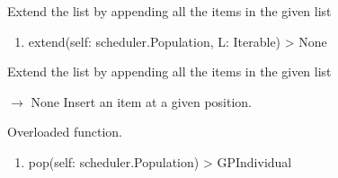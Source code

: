 \documentclass[letterpaper,10pt,english]{sphinxmanual}
\begin{document}
\begin{fulllineitems}
\begin{fulllineitems}
\begin{enumerate}
\end{enumerate}

\sphinxAtStartPar
Extend the list by appending all the items in the given list
\begin{enumerate}
%
\setcounter{enumi}{1}
\item {} 
\sphinxAtStartPar
extend(self: scheduler.Population, L: Iterable) \sphinxhyphen{}\textgreater{} None

\end{enumerate}

\sphinxAtStartPar
Extend the list by appending all the items in the given list

\end{fulllineitems}


\begin{fulllineitems}
\label{\detokenize{api:scheduler.Population.insert}}
\pysigstartsignatures
\pysiglinewithargsret
{}
{\sphinxparamcomma {}\sphinxparamcomma {}}
{{ $\rightarrow$ None}}
\pysigstopsignatures
\sphinxAtStartPar
Insert an item at a given position.

\end{fulllineitems}


\begin{fulllineitems}
\label{\detokenize{api:scheduler.Population.pop}}
\pysigstartsignatures
\pysiglinewithargsret
{}
{\sphinxparamcomma {}}
{}
\pysigstopsignatures
\sphinxAtStartPar
Overloaded function.
\begin{enumerate}
%
\item {} 
\sphinxAtStartPar
pop(self: scheduler.Population) \sphinxhyphen{}\textgreater{} GPIndividual

\end{enumerate}


\end{fulllineitems}
\end{fulllineitems}
\end{document}
